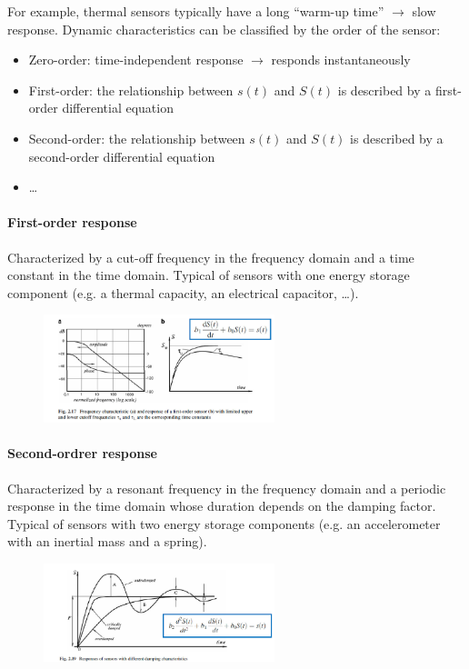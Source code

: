 For example, thermal sensors typically have a long “warm-up time” $\rightarrow$ slow response.
Dynamic characteristics can be classified by the order of the sensor:
\begin{itemize}
\item Zero-order: time-independent response $\rightarrow$ responds instantaneously
\item First-order: the relationship between $s(t)$ and $S(t)$ is
described by a first-order differential equation
\item Second-order: the relationship between $s(t)$ and $S(t)$ is
described by a second-order differential equation
\item \dots
\end{itemize}

\paragraph{First-order response}
Characterized by a cut-off frequency in the frequency domain
and a time constant in the time domain. Typical of sensors with one energy storage component
(e.g. a thermal capacity, an electrical capacitor, \dots).

\begin{figure}[H]
    \centering
    \includegraphics[width = 0.6\textwidth]{L1/img/first-order.PNG}
\end{figure}

\paragraph{Second-ordrer response}
Characterized by a resonant frequency in the frequency
domain and a periodic response in the time domain whose
duration depends on the damping factor. Typical of sensors with two energy storage components
(e.g. an accelerometer with an inertial mass and a spring).

\begin{figure}[H]
    \centering
    \includegraphics[width = 0.6\textwidth]{L1/img/second-order.PNG}
\end{figure}
